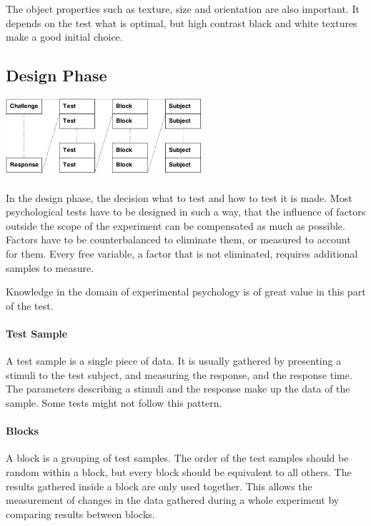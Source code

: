 The object properties such as texture, size and orientation are also important.
It depends on the test what is optimal, but high contrast black and white textures make a good initial choice.


\subsection{Design Phase}

\begin{center}
\includegraphics[width=7.25cm]{media/test.pdf}
\end{center}

\paragraph{}
In the design phase, the decision what to test and how to test it is made.
Most psychological tests have to be designed in such a way, that the influence of factors outside the scope of the experiment can be compensated as much as possible.
Factors have to be counterbalanced to eliminate them,
or measured to account for them.
Every free variable, a factor that is not eliminated, requires additional samples to measure.

Knowledge in the domain of experimental psychology is of great value in this part of the test.

\paragraph{Test Sample}
A test sample is a single piece of data.
It is usually gathered by presenting a stimuli to the test subject,
and measuring the response, and the response time.
The parameters describing a stimuli and the response make up the data of the sample.
Some tests might not follow this pattern.

\paragraph{Blocks}
A block is a grouping of test samples.
The order of the test samples should be random within a block, but every block should be equivalent to all others.
The results gathered inside a block are only used together.
This allows the measurement of changes in the data gathered during a whole experiment by comparing results between blocks.

